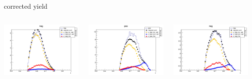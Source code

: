 \begin{frame}{corrected yield}
\begin{columns}
\begin{column}[T]{0.25\textwidth}
\includegraphics[width = \textwidth]{results/yield/statistics_corr/yield_x_Q2_z_0.55_4.764_0.60_neg.png}
\end{column}
\begin{column}[T]{0.25\textwidth}
\includegraphics[width = \textwidth]{results/yield/statistics_corr/yield_x_Q2_z_0.55_4.764_0.70_pos.png}
\end{column}
\begin{column}[T]{0.25\textwidth}
\includegraphics[width = \textwidth]{results/yield/statistics_corr/yield_x_Q2_z_0.55_4.764_0.70_neg.png}
\end{column}
\end{columns}
\end{frame}
